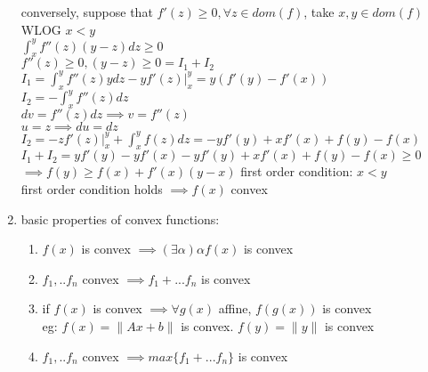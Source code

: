 \documentclass[12pt,letter]{article}
\newcommand{\norm}[1]{\|#1\|}
\newcommand{\set}[1]{\{#1\}}
\begin{document}
\begin{enumerate}
  conversely, suppose that $f'(z) \geq 0, \forall z \in dom(f)$, take $x,y \in dom(f)$ WLOG $x < y$\\
  $\int_x^y f''(z)(y-z) dz \geq 0$\\
  $f''(z) \geq 0, (y-z) \geq 0 = I_1+I_2$\\
  $I_1 = \int_x^y f''(z)y dz- y f'(z)|_x^y = y(f'(y)-f'(x))$\\
  $I_2 = -\int_x^y f''(z) dz$\\
  $dv=f''(z) dz \implies v = f''(z)$\\
  $u=z\implies du = dz$\\
  $I_2 = -z f'(z)|_x^y + \int_x^y f(z) dz = -y f'(y) + x f'(x)+f(y)-f(x)$\\
  $I_1+I_2=y f'(y)-y f'(x)-y f'(y) + x f'(x) + f(y)-f(x) \geq 0$\\
  $\implies f(y) \geq f(x) + f'(x)(y-x)$ first order condition: $x<y$\\
  first order condition holds $\implies f(x)$ convex\\

\item basic properties of convex functions:
  \begin{enumerate}
  \item $f(x)$ is convex $\implies (\exists \alpha) \alpha f(x)$ is convex
  \item $f_1,..f_n$ convex $\implies f_1+...f_n$ is convex
  \item if $f(x)$ is convex $\implies \forall g(x)$ affine, $f(g(x))$ is convex\\
    eg: $f(x) = \|Ax+b\|$ is convex. $f(y)=\norm{y}$ is convex
  \item $f_1,..f_n$ convex $\implies max\set{f_1+...f_n}$ is convex
  \end{enumerate}
\end{enumerate}
\end{document}
